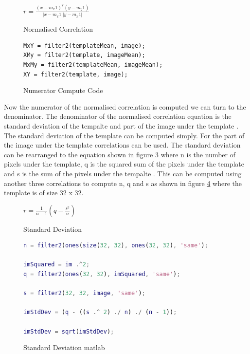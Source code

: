 \documentclass{article}
\begin{document}
\begin{figure}[H]
\begin{center}
$r=\frac{(x-m_x1)^T(y-m_y1)}{|x-m_x1||y-m_x1|}$
\end{center}
\caption{Normalised Correlation}
\label{fig:normcoreq}
\end{figure}

\begin{figure}[H]
\begin{lstlisting}
MxY = filter2(templateMean, image);
XMy = filter2(template, imageMean);
MxMy = filter2(templateMean, imageMean);
XY = filter2(template, image);
\end{lstlisting}
\caption{Numerator Compute Code}
\label{fig:numerator}
\end{figure}

Now the numerator of the normalised correlation is computed we can turn to the
denominator. The denominator of the normalised correlation equation is the
standard deviation of the tempalte and part of the image under the template \cite{crosscor}.
The standard deviation of the template can be computed simply. For the part of the
image under the template correlations can be used. The standard deviation can be
rearranged to the equation shown in figure \ref{fig:normcoreq} where n is the
number of pixels under the template, q is the squared sum of the pixels under the
template and s is the sum of the pixels under the tempalte \cite{stddev}. This can
be computed using another three correlations to compute n, q and s as shown in
figure \ref{fig:stddeccode} where the template is of size 32 x 32.\\

\begin{figure}[H]
\begin{center}
$r=\frac{1}{n - 1}(q - \frac{s^2}{n})$
\end{center}
\caption{Standard Deviation}
\label{fig:normcoreq}
\end{figure}

\begin{figure}[H]
\begin{lstlisting}[language=matlab]
n = filter2(ones(size(32, 32), ones(32, 32), 'same');

imSquared = im .^2;
q = filter2(ones(32, 32), imSquared, 'same');

s = filter2(32, 32, image, 'same');

imStdDev = (q - ((s .^ 2) ./ n) ./ (n - 1));

imStdDev = sqrt(imStdDev);
\end{lstlisting}
\caption{Standard Deviation matlab}
\label{fig:stddeccode}
\end{figure}
\end{document}
